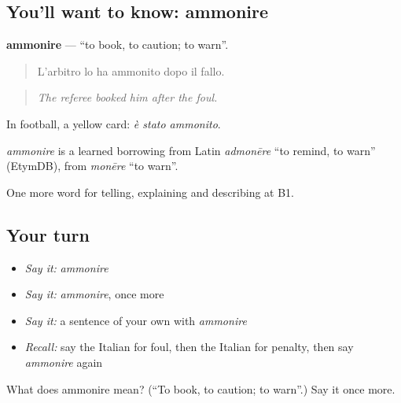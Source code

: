 \subsection*{You'll want to know: ammonire}
\textbf{ammonire} — \textquotedblleft{}to book, to caution; to warn\textquotedblright{}.

\begin{quote}
L'arbitro lo ha ammonito dopo il fallo.
\end{quote}

\begin{quote}
\emph{The referee booked him after the foul.}
\end{quote}

In football, a yellow card: \emph{è stato ammonito}.

\begin{cousinweb}
\emph{ammonire} is a learned borrowing from Latin \emph{admonēre} \textquotedblleft{}to remind, to warn\textquotedblright{} (EtymDB), from \emph{monēre} \textquotedblleft{}to warn\textquotedblright{}.
\end{cousinweb}

\begin{grammarlens}[title={What you've built}]
One more word for telling, explaining and describing at B1.
\end{grammarlens}

\subsection*{Your turn}
\begin{itemize}
\raggedright
  \item \emph{Say it:} \emph{ammonire}
  \item \emph{Say it:} \emph{ammonire}, once more
  \item \emph{Say it:} a sentence of your own with \emph{ammonire}
  \item \emph{Recall:} say the Italian for foul, then the Italian for penalty, then say \emph{ammonire} again
\end{itemize}

\begin{tcolorbox}[breakable,colback=teal!4,colframe=teal!35!black,title={Before you move on}]
What does ammonire mean? (\textquotedblleft{}To book, to caution; to warn\textquotedblright{}.) Say it once more.
\end{tcolorbox}
